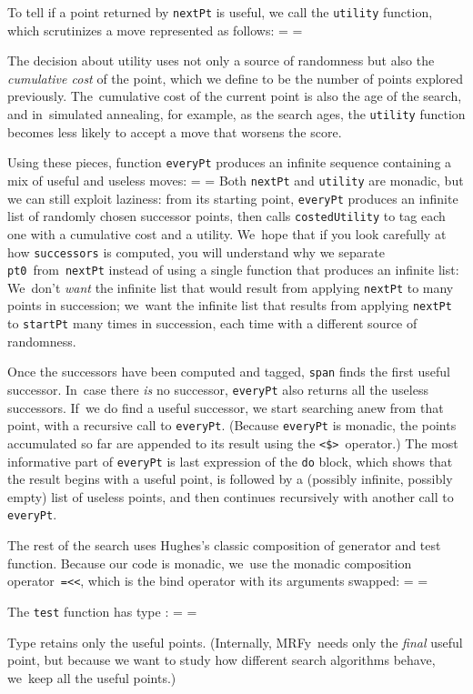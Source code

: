 \documentclass[preprint,nonatbib,blockstyle,times]{sigplanconf}
\newcommand\mrfy{MRFy} %
\newif\ifverbatimsmall
\newcommand\smallverbatiminput[1]{%
  \verbatimsmalltrue
  \presvtopsep=\topsep
  \topsep=0.78\topsep
  \verbatimsmallfalse
  \topsep=\presvtopsep
}
\newcommand\smallfuzzverbatiminput[2]{%
  \hfuzz=#1 \smallverbatiminput{#2}\hfuzz=0pt }
\begin{document}
To tell if a point returned by \texttt{nextPt} is useful, we call
 the \texttt{utility} function,
which scrutinizes a move represented as follows:
\smallverbatiminput{move}
The decision about utility uses not only a source of randomness but
also the \emph{cumulative cost} of the point, which we define to be
the number of points explored previously.
The~cumulative cost of the current point is also the age of the
search,
and
in~simulated annealing, for example, as the search ages,
the \texttt{utility} function becomes less likely to accept a move
that worsens the score.

\noindent
\vbox{
Using these pieces, function \texttt{everyPt} produces an infinite
sequence containing a mix of useful and useless moves:
\smallfuzzverbatiminput{10.8pt}{everygen}
}
\noindent
Both \texttt{nextPt} and \texttt{utility} are monadic, but 
we can still exploit laziness:
from its starting point, \texttt{everyPt} produces an infinite list of
randomly chosen successor points, then calls \texttt{costedUtility} to
tag each one with a cumulative cost and a utility.
We~hope that if you look carefully at how \texttt{successors} is computed,
you will understand why we
separate \texttt{pt0}~from~\texttt{nextPt} instead of using a single
function that produces an infinite list:
We~don't \emph{want} the infinite list that would result from
applying \texttt{nextPt} to many points in succession;
we~want the infinite list that results from applying \texttt{nextPt}
to \texttt{startPt} many times in succession, each time with a
different source of randomness.

Once the successors have been computed and tagged,
\texttt{span} finds the first useful successor.
In~case there \emph{is} no successor, \texttt{everyPt} also returns
all the useless successors.
If~we do find a useful successor, we start searching anew from that
point, with a recursive call to \texttt{everyPt}.
(Because \texttt{everyPt} is monadic, the points accumulated so far are
appended to its result using the \verb+<$>+~operator.)
%
The most informative part of \texttt{everyPt} is last expression of
the \texttt{do} block,
which shows that the result begins with a useful point,
is followed by a (possibly infinite, possibly empty) list of useless
points, and then continues recursively with another call to \texttt{everyPt}.

The rest of the search uses Hughes's
classic composition of generator  and test function.
Because our code is monadic, we~use the monadic composition
operator~\texttt{=<<}, which is the bind operator with its arguments
swapped: 
\smallverbatiminput{search}
The \texttt{test} function has type :
\smallverbatiminput{stop}
Type  retains only the useful points.
(Internally, \mrfy\ needs only the \emph{final} useful point,
but because we want to study how different search algorithms behave,
we~keep all the useful points.)
\end{document}
